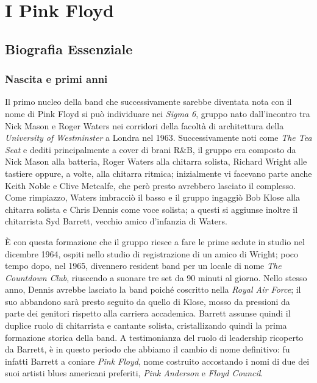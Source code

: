 \documentclass[class=book, crop=false, oneside, 12pt]{standalone}
\begin{document}
    \chapter{I Pink Floyd}

    \section{Biografia Essenziale}\label{sec:01-bio}
    \subsection{Nascita e primi anni}
    Il primo nucleo della band che successivamente sarebbe diventata nota con il nome di Pink Floyd si può individuare nei \emph{Sigma 6}, gruppo nato dall'incontro tra Nick Mason e Roger Waters nei corridori della facoltà di architettura della \emph{University of Westminster} a Londra nel 1963. Successivamente noti come \emph{The Tea Seat} e dediti principalmente a cover di brani R\&B, il gruppo era composto da Nick Mason alla batteria, Roger Waters alla chitarra solista, Richard Wright alle tastiere oppure, a volte, alla chitarra ritmica; inizialmente vi facevano parte anche Keith Noble e Clive Metcalfe, che però presto avrebbero lasciato il complesso. Come rimpiazzo, Waters imbracciò il basso e il gruppo ingaggiò Bob Klose alla chitarra solista e Chris Dennis come voce solista; a questi si aggiunse inoltre il chitarrista Syd Barrett, vecchio amico d'infanzia di Waters.

    È con questa formazione che il gruppo riesce a fare le prime sedute in studio nel dicembre 1964, ospiti nello studio di registrazione di un amico di Wright; poco tempo dopo, nel 1965, divennero resident band per un locale di nome \emph{The Countdown Club}, riuscendo a suonare tre set da 90 minuti al giorno. Nello stesso anno, Dennis avrebbe lasciato la band poiché coscritto nella \emph{Royal Air Force}; il suo abbandono sarà presto seguito da quello di Klose, mosso da pressioni da parte dei genitori rispetto alla carriera accademica. Barrett assunse quindi il duplice ruolo di chitarrista e cantante solista, cristallizando quindi la prima formazione storica della band. A testimonianza del ruolo di leadership ricoperto da Barrett, è in questo periodo che abbiamo il cambio di nome definitivo: fu infatti Barrett a coniare \emph{Pink Floyd}, nome costruito accostando i nomi di due dei suoi artisti blues americani preferiti, \emph{Pink Anderson} e \emph{Floyd Council}.
\end{document}
